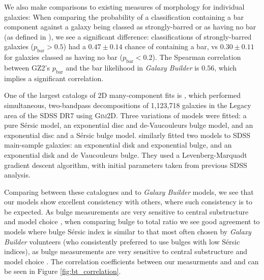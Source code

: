 \documentclass[../main.tex]{subfiles}
\begin{document}
We also make comparisons to existing measures of morphology for individual galaxies: When comparing the probability of a classification containing a bar component against a galaxy being classed as strongly-barred or as having no bar (as defined in \citealt{Masters2010:1003.0449v2}), we see a significant difference: classifications of strongly-barred galaxies ($p_\text{bar} > 0.5$) had a $0.47 \pm 0.14$ chance of containing a bar, vs $0.30 \pm 0.11$ for galaxies classed as having no bar ($p_\text{bar} < 0.2$). The Spearman correlation between GZ2's $p_\text{bar}$ and the bar likelihood in \textit{Galaxy Builder} is $0.56$, which implies a significant correlation.

One of the largest catalogs of 2D many-component fits is \citet{Simard2011:1107.1518v1}, which performed simultaneous, two-bandpass decompositions of 1,123,718 galaxies in the Legacy area of the SDSS DR7 using \textsc{Gim2D}. Three variations of models were fitted: a pure S\'ersic model, an exponential disc and de-Vaucouleurs bulge model, and an exponential disc and a S\'ersic bulge model. \citet{2012MNRAS.421.2277L} similarly fitted two models to SDSS main-sample galaxies: an exponential disk and exponential bulge, and an exponential disk and de Vaucouleurs bulge. They used a Levenberg-Marquadt gradient descent algorithm, with initial parameters taken from previous SDSS analysis.

Comparing between these catalogues and to \textit{Galaxy Builder} models, we see that our models show excellent consistency with others, where such consistency is to be expected. As bulge measurements are very sensitive to central substructure and model choice \citep{Gao2017:1709.00746v1}, when comparing bulge to total ratio we see good agreement to models where bulge S\'ersic index is similar to that most often chosen by \textit{Galaxy Builder} volunteers (who consistently preferred to use bulges with low S\'ersic indices), as bulge measurements are very sensitive to central substructure and model choice \citep{Gao2017:1709.00746v1}. The correlation coefficients between our measurments and \citet{Simard2011:1107.1518v1} and \citet{2012MNRAS.421.2277L} can be seen in Figure \ref{fig:bt_correlation}.
\end{document}
